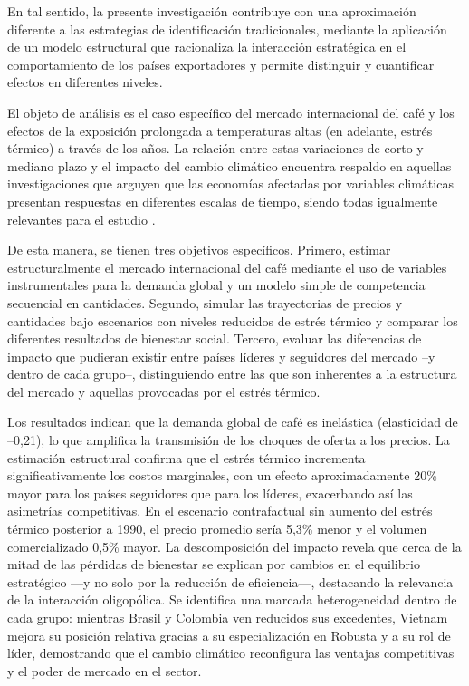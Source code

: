 En tal sentido, la presente investigación contribuye con una aproximación diferente a las estrategias de identificación tradicionales, mediante la aplicación de un modelo estructural que racionaliza la interacción estratégica en el comportamiento de los países exportadores y permite distinguir y cuantificar efectos en diferentes niveles.

El objeto de análisis es el caso específico del mercado internacional del café y los efectos de la exposición prolongada a temperaturas altas (en adelante, estrés térmico) a través de los años. La relación entre estas variaciones de corto y mediano plazo y el impacto del cambio climático encuentra respaldo en aquellas investigaciones que arguyen que las economías afectadas por variables climáticas presentan respuestas en diferentes escalas de tiempo, siendo todas igualmente relevantes para el estudio \citep{figari2025climate,hsiang2016}.

De esta manera, se tienen tres objetivos específicos. Primero, estimar estructuralmente el mercado internacional del café mediante el uso de variables instrumentales para la demanda global y un modelo simple de competencia secuencial en cantidades. Segundo, simular las trayectorias de precios y cantidades bajo escenarios con niveles reducidos de estrés térmico y comparar los diferentes resultados de bienestar social. Tercero, evaluar las diferencias de impacto que pudieran existir entre países líderes y seguidores del mercado --y dentro de cada grupo--, distinguiendo entre las que son inherentes a la estructura del mercado y aquellas provocadas por el estrés térmico.

Los resultados indican que la demanda global de café es inelástica (elasticidad de –0,21), lo que amplifica la transmisión de los choques de oferta a los precios. La estimación estructural confirma que el estrés térmico incrementa significativamente los costos marginales, con un efecto aproximadamente 20\% mayor para los países seguidores que para los líderes, exacerbando así las asimetrías competitivas. En el escenario contrafactual sin aumento del estrés térmico posterior a 1990, el precio promedio sería 5,3\% menor y el volumen comercializado 0,5\% mayor. La descomposición del impacto revela que cerca de la mitad de las pérdidas de bienestar se explican por cambios en el equilibrio estratégico —y no solo por la reducción de eficiencia—, destacando la relevancia de la interacción oligopólica. Se identifica una marcada heterogeneidad dentro de cada grupo: mientras Brasil y Colombia ven reducidos sus excedentes, Vietnam mejora su posición relativa gracias a su especialización en Robusta y a su rol de líder, demostrando que el cambio climático reconfigura las ventajas competitivas y el poder de mercado en el sector.


